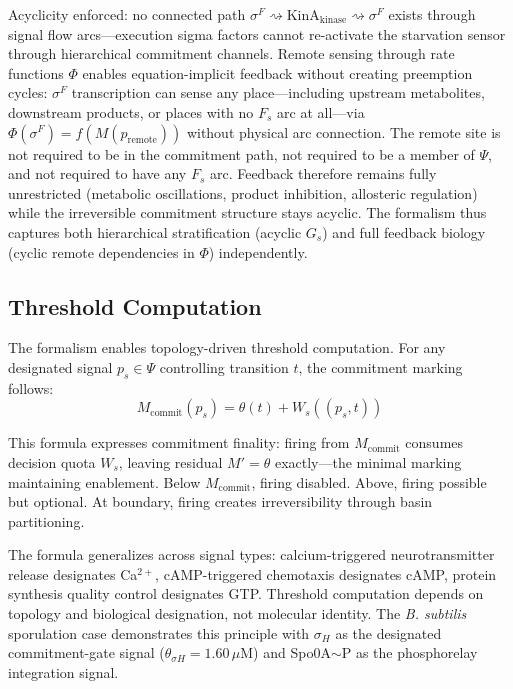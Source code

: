 \documentclass[10pt,letterpaper]{article}
\begin{document}
Acyclicity enforced: no connected path $\sigma^F \rightsquigarrow \text{KinA}_{\text{kinase}} \rightsquigarrow \sigma^F$ exists through signal flow arcs---execution sigma factors cannot re-activate the starvation sensor through hierarchical commitment channels. Remote sensing through rate functions $\Phi$ enables equation-implicit feedback without creating preemption cycles: $\sigma^F$ transcription can sense any place---including upstream metabolites, downstream products, or places with no $F_s$ arc at all---via $\Phi(\sigma^F) = f(M(p_{\text{remote}}))$ without physical arc connection. The remote site is not required to be in the commitment path, not required to be a member of $\Psi$, and not required to have any $F_s$ arc. Feedback therefore remains fully unrestricted (metabolic oscillations, product inhibition, allosteric regulation) while the irreversible commitment structure stays acyclic. The formalism thus captures both hierarchical stratification (acyclic $G_s$) and full feedback biology (cyclic remote dependencies in $\Phi$) independently.

\subsection{Threshold Computation}

The formalism enables topology-driven threshold computation. For any designated signal $p_s \in \Psi$ controlling transition $t$, the commitment marking follows:
\begin{equation}
M_{\text{commit}}(p_s) = \theta(t) + W_s((p_s,t))
\end{equation}

This formula expresses commitment finality: firing from $M_{\text{commit}}$ consumes decision quota $W_s$, leaving residual $M' = \theta$ exactly---the minimal marking maintaining enablement. Below $M_{\text{commit}}$, firing disabled. Above, firing possible but optional. At boundary, firing creates irreversibility through basin partitioning.

The formula generalizes across signal types: calcium-triggered neurotransmitter release designates Ca$^{2+}$, cAMP-triggered chemotaxis designates cAMP, protein synthesis quality control designates GTP. Threshold computation depends on topology and biological designation, not molecular identity. The \textit{B. subtilis} sporulation case demonstrates this principle with $\sigma_H$ as the designated commitment-gate signal ($\theta_{\sigma H} = 1.60\,\mu$M) and Spo0A$\sim$P as the phosphorelay integration signal.
\end{document}
